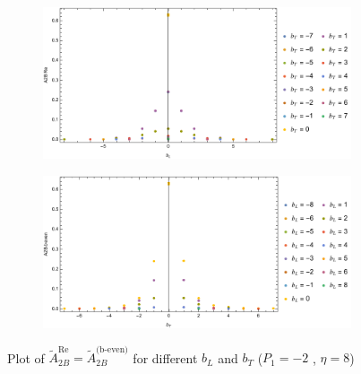 \documentclass[]{article}
\numberwithin{equation}{section}
\newcommand{\tAmp}{\widetilde{A}}
\newcommand{\tAmp}{\ensuremath{\widetilde{A}^{(+)}}}
\begin{document}
\begin{figure}[h!]
     \centering
     \begin{subfigure}[b]{0.45\textwidth}
         \centering
         \includegraphics[width=\textwidth]{Amp_plots/bL_A2B_b_even_P1_-2_eta_8.pdf}
     \end{subfigure}
     \begin{subfigure}[b]{0.45\textwidth}
         \centering
         \includegraphics[width=\textwidth]{Amp_plots/bT_A2B_b_even_P1_-2_eta_8.pdf}
     \end{subfigure}
        \caption{Plot of  $\tAmp^{\text{Re}}_{2B}=\tAmp^{\text{(b-even)}}_{2B}$ for different $b_{L}$ and $b_{T}$  ($P_{1} = -2$ , $\eta=8$)}
\end{figure}
\end{document}
